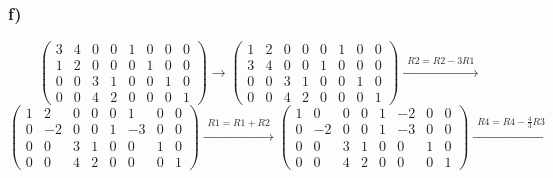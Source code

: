 \documentclass[11pt]{article}
\begin{document}
\subsubsection*{f)}
\[
\left(
\begin{array}{cccc|cccc}
3 & 4 & 0 & 0 & 1 & 0 & 0 & 0\\
1 & 2 & 0 & 0 & 0 & 1 & 0 & 0\\
0 & 0 & 3 & 1 & 0 & 0 & 1 & 0\\
0 & 0 & 4 & 2 & 0 & 0 & 0 & 1
\end{array}
\right)
\rightarrow
\left(
\begin{array}{cccc|cccc}
1 & 2 & 0 & 0 & 0 & 1 & 0 & 0\\
3 & 4 & 0 & 0 & 1 & 0 & 0 & 0\\
0 & 0 & 3 & 1 & 0 & 0 & 1 & 0\\
0 & 0 & 4 & 2 & 0 & 0 & 0 & 1
\end{array}
\right)
\overset{\begin{matrix}
  R2 = R2-3R1
 \end{matrix}}{\rightarrow}
\]
\[
\left(
\begin{array}{cccc|cccc}
1 & 2 & 0 & 0 & 0 & 1 & 0 & 0\\
0 & -2 & 0 & 0 & 1 & -3 & 0 & 0\\
0 & 0 & 3 & 1 & 0 & 0 & 1 & 0\\
0 & 0 & 4 & 2 & 0 & 0 & 0 & 1
\end{array}
\right)
\overset{\begin{matrix}
R1 = R1+R2
\end{matrix}}{\rightarrow}
\left(
\begin{array}{cccc|cccc}
1 & 0 & 0 & 0 & 1 & -2 & 0 & 0\\
0 & -2 & 0 & 0 & 1 & -3 & 0 & 0\\
0 & 0 & 3 & 1 & 0 & 0 & 1 & 0\\
0 & 0 & 4 & 2 & 0 & 0 & 0 & 1
\end{array}
\right)
\overset{\begin{matrix}
R4=R4-\frac{4}{3}R3
\end{matrix}}{\rightarrow}
\]
\end{document}
